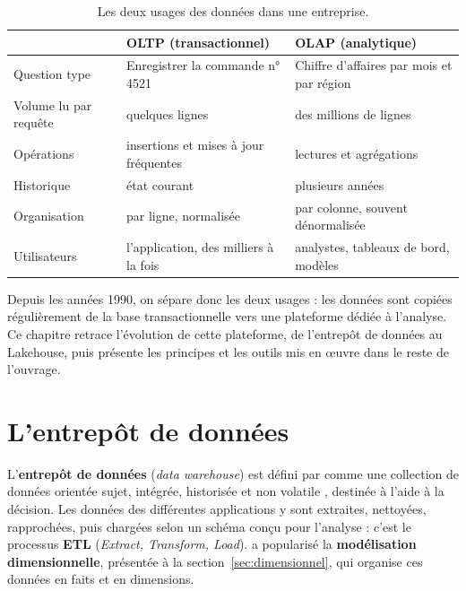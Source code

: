 \begin{table}[H]
\centering\small
\renewcommand{\arraystretch}{1.3}
\begin{tabularx}{\textwidth}{@{}l X X@{}}
\toprule
& \textbf{OLTP (transactionnel)} & \textbf{OLAP (analytique)} \\
\midrule
Question type & Enregistrer la commande n° 4521 & Chiffre d'affaires par mois et par région \\
Volume lu par requête & quelques lignes & des millions de lignes \\
Opérations & insertions et mises à jour fréquentes & lectures et agrégations \\
Historique & état courant & plusieurs années \\
Organisation & par ligne, normalisée & par colonne, souvent dénormalisée \\
Utilisateurs & l'application, des milliers à la fois & analystes, tableaux de bord, modèles \\
\bottomrule
\end{tabularx}
\caption{Les deux usages des données dans une entreprise.}
\label{tab:oltp-olap}
\end{table}

Depuis les années 1990, on sépare donc les deux usages : les données sont copiées régulièrement de
la base transactionnelle vers une plateforme dédiée à l'analyse. Ce chapitre retrace l'évolution de
cette plateforme, de l'entrepôt de données au Lakehouse, puis présente les principes et les outils
mis en œuvre dans le reste de l'ouvrage.

\section{L'entrepôt de données}

L'\textbf{entrepôt de données} (\emph{data warehouse}) est défini par
\citet{inmon2005} comme une collection de données \og orientée sujet, intégrée, historisée et non
volatile \fg{}, destinée à l'aide à la décision. Les données des différentes applications y sont
extraites, nettoyées, rapprochées, puis chargées selon un schéma conçu pour l'analyse : c'est le
processus \textbf{ETL} (\emph{Extract, Transform, Load}). \citet{kimball2013} a
popularisé la \textbf{modélisation dimensionnelle}, présentée à la section~\ref{sec:dimensionnel},
qui organise ces données en faits et en dimensions.

